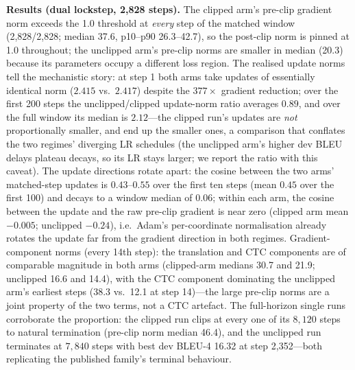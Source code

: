 \documentclass[pdflatex,sn-chicago]{sn-jnl}
\begin{document}
\textbf{Results (dual lockstep, 2{,}828 steps).} The clipped arm's pre-clip gradient norm exceeds the 1.0 threshold at \emph{every} step of the matched window (2{,}828/2{,}828; median 37.6, p10--p90 26.3--42.7), so the post-clip norm is pinned at 1.0 throughout; the unclipped arm's pre-clip norms are smaller in median (20.3) because its parameters occupy a different loss region. The realised update norms tell the mechanistic story: at step 1 both arms take updates of essentially identical norm ($2.415$ vs.\ $2.417$) despite the $377\times$ gradient reduction; over the first 200 steps the unclipped/clipped update-norm ratio averages $0.89$, and over the full window its median is $2.12$---the clipped run's updates are \emph{not} proportionally smaller, and end up the smaller ones, a comparison that conflates the two regimes' diverging LR schedules (the unclipped arm's higher dev BLEU delays plateau decays, so its LR stays larger; we report the ratio with this caveat). The update directions rotate apart: the cosine between the two arms' matched-step updates is $0.43$--$0.55$ over the first ten steps (mean $0.45$ over the first 100) and decays to a window median of $0.06$; within each arm, the cosine between the update and the raw pre-clip gradient is near zero (clipped arm mean $-0.005$; unclipped $-0.24$), i.e.\ Adam's per-coordinate normalisation already rotates the update far from the gradient direction in both regimes. Gradient-component norms (every 14th step): the translation and CTC components are of comparable magnitude in both arms (clipped-arm medians 30.7 and 21.9; unclipped 16.6 and 14.4), with the CTC component dominating the unclipped arm's earliest steps (38.3 vs.\ 12.1 at step 14)---the large pre-clip norms are a joint property of the two terms, not a CTC artefact. The full-horizon single runs corroborate the proportion: the clipped run clips at every one of its $8{,}120$ steps to natural termination (pre-clip norm median 46.4), and the unclipped run terminates at $7{,}840$ steps with best dev BLEU-4 16.32 at step 2{,}352---both replicating the published family's terminal behaviour.
\end{document}
